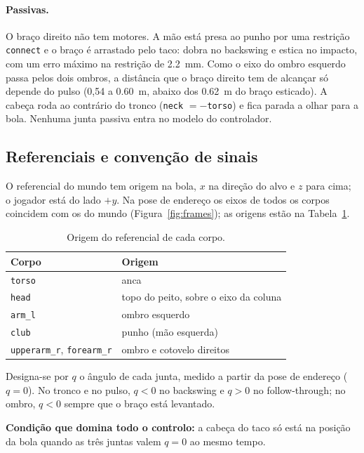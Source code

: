 \documentclass[11pt,a4paper]{article}
\begin{document}
\paragraph{Passivas.}
O braço direito não tem motores. A mão está presa ao punho por uma restrição
\texttt{connect} e o braço é arrastado pelo taco: dobra no backswing e estica
no impacto, com um erro máximo na restrição de \SI{2.2}{\milli\meter}. Como o
eixo do ombro esquerdo passa pelos dois ombros, a distância que o braço direito
tem de alcançar só depende do pulso (0,54 a \SI{0.60}{\meter}, abaixo dos
\SI{0.62}{\meter} do braço esticado). A cabeça roda ao contrário do tronco
(\texttt{neck} $= -$\texttt{torso}) e fica parada a olhar para a bola. Nenhuma
junta passiva entra no modelo do controlador.

\subsection{Referenciais e convenção de sinais}

O referencial do mundo tem origem na bola, $x$ na direção do alvo e $z$ para
cima; o jogador está do lado $+y$. Na pose de endereço os eixos de todos os
corpos coincidem com os do mundo (Figura~\ref{fig:frames}); as origens estão na
Tabela~\ref{tab:frames}.

\begin{table}[H]
\centering
\caption{Origem do referencial de cada corpo.}
\label{tab:frames}
\small
\begin{tabular}{ll}
\toprule
\rowcolor{tabcab}
Corpo & Origem \\
\midrule
\texttt{torso} & anca \\
\texttt{head}  & topo do peito, sobre o eixo da coluna \\
\texttt{arm\_l} & ombro esquerdo \\
\texttt{club}  & punho (mão esquerda) \\
\texttt{upperarm\_r}, \texttt{forearm\_r} & ombro e cotovelo direitos \\
\bottomrule
\end{tabular}
\end{table}

Designa-se por $q$ o ângulo de cada junta, medido a partir da pose de endereço
($q=0$). No tronco e no pulso, $q<0$ no backswing e $q>0$ no follow-through; no
ombro, $q<0$ sempre que o braço está levantado.

\begin{destaque}
\textbf{Condição que domina todo o controlo:} a cabeça do taco só está na
posição da bola quando as três juntas valem $q=0$ ao mesmo tempo.
\end{destaque}
\end{document}
